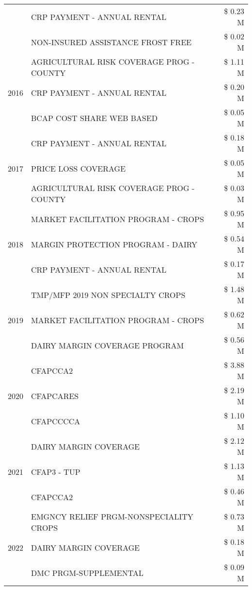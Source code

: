 \begin{tabular}{llr}
 & CRP PAYMENT - ANNUAL RENTAL & \$ 0.23 M \\
 & NON-INSURED ASSISTANCE FROST FREE & \$ 0.02 M \\
\cline{1-3}
\multirow[t]{3}{*}{2016} & AGRICULTURAL RISK COVERAGE PROG - COUNTY & \$ 1.11 M \\
 & CRP PAYMENT - ANNUAL RENTAL & \$ 0.20 M \\
 & BCAP COST SHARE WEB BASED & \$ 0.05 M \\
\cline{1-3}
\multirow[t]{3}{*}{2017} & CRP PAYMENT - ANNUAL RENTAL & \$ 0.18 M \\
 & PRICE LOSS COVERAGE & \$ 0.05 M \\
 & AGRICULTURAL RISK COVERAGE PROG - COUNTY & \$ 0.03 M \\
\cline{1-3}
\multirow[t]{3}{*}{2018} & MARKET FACILITATION PROGRAM - CROPS & \$ 0.95 M \\
 & MARGIN PROTECTION PROGRAM - DAIRY & \$ 0.54 M \\
 & CRP PAYMENT - ANNUAL RENTAL & \$ 0.17 M \\
\cline{1-3}
\multirow[t]{3}{*}{2019} & TMP/MFP 2019 NON SPECIALTY CROPS & \$ 1.48 M \\
 & MARKET FACILITATION PROGRAM - CROPS & \$ 0.62 M \\
 & DAIRY MARGIN COVERAGE PROGRAM & \$ 0.56 M \\
\cline{1-3}
\multirow[t]{3}{*}{2020} & CFAPCCA2 & \$ 3.88 M \\
 & CFAPCARES & \$ 2.19 M \\
 & CFAPCCCCA & \$ 1.10 M \\
\cline{1-3}
\multirow[t]{3}{*}{2021} & DAIRY MARGIN COVERAGE & \$ 2.12 M \\
 & CFAP3 - TUP & \$ 1.13 M \\
 & CFAPCCA2 & \$ 0.46 M \\
\cline{1-3}
\multirow[t]{3}{*}{2022} & EMGNCY RELIEF PRGM-NONSPECIALITY CROPS & \$ 0.73 M \\
 & DAIRY MARGIN COVERAGE & \$ 0.18 M \\
 & DMC PRGM-SUPPLEMENTAL & \$ 0.09 M \\
\cline{1-3}
\bottomrule
\end{tabular}
